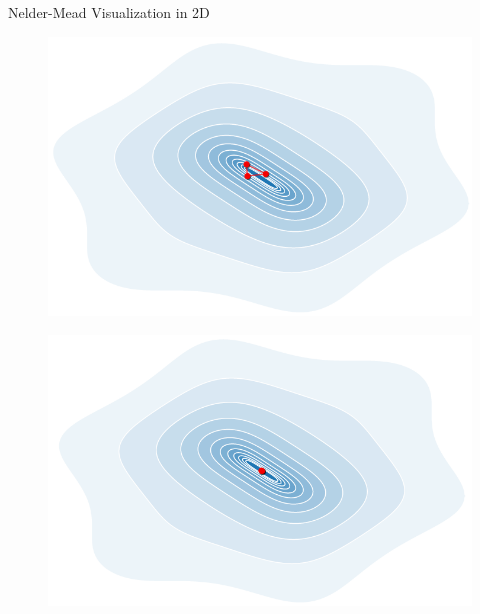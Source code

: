 \documentclass[11pt,compress,t,notes=noshow, xcolor=table]{beamer}
\begin{document}
\begin{vbframe}{Nelder-Mead Visualization in 2D}
\begin{figure}
\begin{minipage}{0.45\textwidth}
    \end{minipage}\hfill
    \begin{minipage}{0.45\textwidth}
        \centering
        \includegraphics[width = 0.75\linewidth]{figure_man/nm_animation2d_4.PNG}
    \end{minipage}
\end{figure}
\vspace*{-0.5cm}
\begin{figure}
    \centering
    \begin{minipage}{0.45\textwidth}
        \centering
        \includegraphics[width = 0.75\linewidth]{figure_man/nm_animation2d_5.PNG}
    \end{minipage}
\end{figure}

\end{vbframe}
\end{document}
